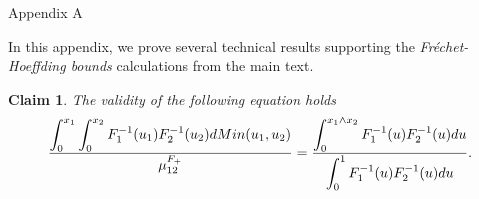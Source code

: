 \documentclass[onecolumn]{article}
\providecommand{\dint}{\displaystyle\int}
\newtheorem{claim}[theorem]{Claim}
\renewcommand{\dint}{\displaystyle\int}
\begin{document}
\begin{flushleft}
{\Large Appendix A}
\end{flushleft}

In this appendix, we prove several technical results supporting the \textit{%
Fr\'{e}chet-Hoeffding bounds} calculations from the main text.

\begin{claim}
\label{fh-claim1} The validity of the following equation holds 
\begin{equation}
\frac{\dint\nolimits_{0}^{x_{1}}\dint%
\nolimits_{0}^{x_{2}}F_{1}^{-1}(u_{1})F_{2}^{-1}(u_{2})dMin(u_{1},u_{2})}{%
\mu _{12}^{F_{+}}}=\frac{\dint\nolimits_{0}^{x_{1}\wedge
x_{2}}F_{1}^{-1}(u)F_{2}^{-1}(u)du}{\dint%
\nolimits_{0}^{1}F_{1}^{-1}(u)F_{2}^{-1}(u)du}.  \label{22.1}
\end{equation}
\end{claim}
\end{document}
